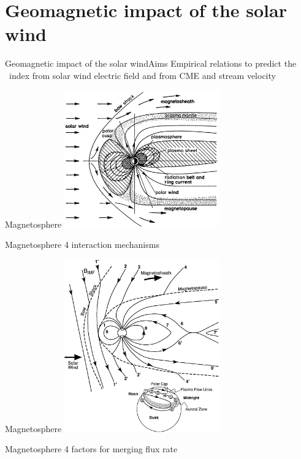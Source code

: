 \section{Geomagnetic impact of the solar wind}

\begin{frame}[c]{Geomagnetic impact of the solar wind}{Aims}
	Empirical relations to predict the \Kp~index from solar wind electric field and from CME and stream velocity
\end{frame}

\begin{frame}[c]{Magnetosphere}{}
	\includegraphics[width=0.5\textwidth]{../figures_of_others/images/Davies1990_magnetosphere_sharpened.png}
\end{frame}
\begin{frame}[c]{Magnetosphere}{}
	4 interaction mechanisms
\end{frame}
\begin{frame}[c]{Magnetosphere}{}
	\includegraphics[width=0.5\textwidth]{../figures_of_others/images/Kivelson1995_fig9_11_dungey_cycle.png}
\end{frame}
\begin{frame}[c]{Magnetosphere}{}
	4 factors for merging flux rate
\end{frame}

